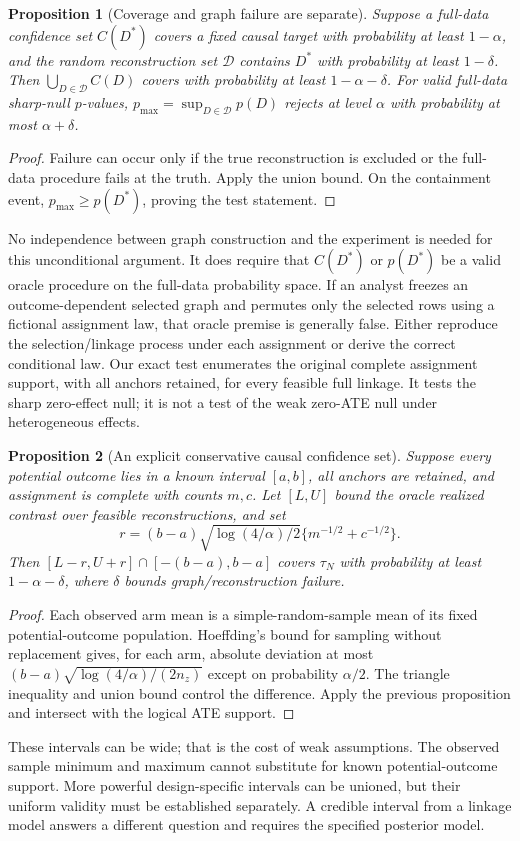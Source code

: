\documentclass[11pt]{article}
\newtheorem{proposition}{Proposition}
\begin{document}
\begin{proposition}[Coverage and graph failure are separate]
Suppose a full-data confidence set $C(D^*)$ covers a fixed causal target with probability
at least $1-\alpha$, and the random reconstruction set $\mathcal D$ contains $D^*$
with probability at least $1-\delta$. Then
$\bigcup_{D\in\mathcal D}C(D)$ covers with probability at least $1-\alpha-\delta$.
For valid full-data sharp-null $p$-values, $p_{\max}=\sup_{D\in\mathcal D}p(D)$
rejects at level $\alpha$ with probability at most $\alpha+\delta$.
\end{proposition}
\begin{proof}
Failure can occur only if the true reconstruction is excluded or the full-data
procedure fails at the truth. Apply the union bound. On the containment event,
$p_{\max}\ge p(D^*)$, proving the test statement.
\end{proof}
No independence between graph construction and the experiment is needed for this
unconditional argument. It does require that $C(D^*)$ or $p(D^*)$ be a valid oracle
procedure on the full-data probability space. If an analyst freezes an outcome-dependent
selected graph and permutes only the selected rows using a fictional assignment law,
that oracle premise is generally false. Either reproduce the selection/linkage process
under each assignment or derive the correct conditional law. Our exact test enumerates
the original complete assignment support, with all anchors retained, for every feasible
full linkage. It tests the sharp zero-effect null; it is not a test of the weak zero-ATE
null under heterogeneous effects.

\begin{proposition}[An explicit conservative causal confidence set]
Suppose every potential outcome lies in a known interval $[a,b]$, all anchors are
retained, and assignment is complete with counts $m,c$. Let $[L,U]$ bound the oracle
realized contrast over feasible reconstructions, and set
\[
 r=(b-a)\sqrt{\log(4/\alpha)/2}\{m^{-1/2}+c^{-1/2}\}.
\]
Then $[L-r,U+r]\cap[-(b-a),b-a]$ covers $\tau_N$ with probability at least
$1-\alpha-\delta$, where $\delta$ bounds graph/reconstruction failure.
\end{proposition}
\begin{proof}
Each observed arm mean is a simple-random-sample mean of its fixed potential-outcome
population. Hoeffding's bound for sampling without replacement \cite{hoeffding} gives, for each arm,
absolute deviation at most $(b-a)\sqrt{\log(4/\alpha)/(2n_z)}$ except on probability
$\alpha/2$. The triangle inequality and union bound control the difference. Apply the
previous proposition and intersect with the logical ATE support.
\end{proof}
These intervals can be wide; that is the cost of weak assumptions. The observed sample
minimum and maximum cannot substitute for known potential-outcome support. More
powerful design-specific intervals can be unioned, but their uniform validity must be
established separately. A credible interval from a linkage model answers a different
question and requires the specified posterior model.
\end{document}
